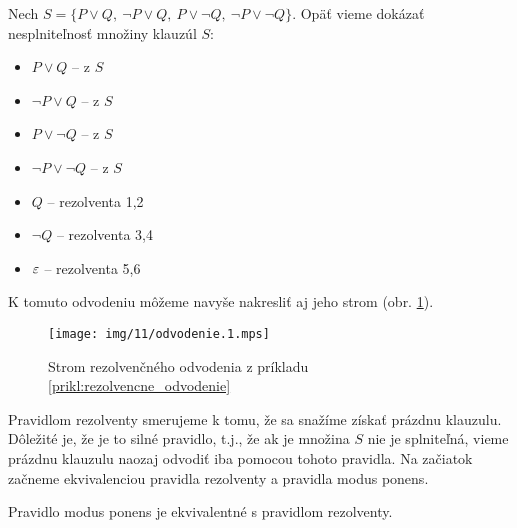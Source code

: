 \begin{priklad}
    \label{prikl:rezolvencne_odvodenie}
    Nech $S=\{P \lor Q,\ \neg P \lor Q,\ 
            P \lor \neg Q,\ \neg P \lor \neg Q\}$.
    Opäť vieme dokázať nesplniteľnosť množiny klauzúl $S$:

    \begin{itemize}
	\item[1:] $P \lor Q$ -- z $S$
	\item[2:] $\neg P \lor Q$ -- z $S$
	\item[3:] $P \lor \neg Q$ -- z $S$
	\item[4:] $\neg P \lor \neg Q$ -- z $S$
	\item[5:] $Q$ -- rezolventa 1,2
	\item[6:] $\neg Q$ -- rezolventa 3,4
        \item[7:] $\varepsilon$ -- rezolventa 5,6
    \end{itemize}

    K tomuto odvodeniu môžeme navyše nakresliť aj jeho strom (obr.
    \ref{fig:strom_odvodenia}).

    \begin{figure}[h]
	\centering\texttt{[image: img/11/odvodenie.1.mps]}
	\caption{Strom rezolvenčného odvodenia z príkladu 
            \ref{prikl:rezolvencne_odvodenie}}
        \label{fig:strom_odvodenia}
    \end{figure}
\end{priklad}

\begin{poznamka}
    Pravidlom rezolventy smerujeme k tomu, že sa snažíme získať
    prázdnu klauzulu. Dôležité je, že je to silné pravidlo,
    t.j., že ak je množina $S$ nie je splniteľná, vieme prázdnu
    klauzulu naozaj odvodiť iba pomocou tohoto pravidla. Na začiatok
    začneme ekvivalenciou pravidla rezolventy a pravidla modus ponens.
\end{poznamka}

\begin{lema}
    Pravidlo modus ponens je ekvivalentné s pravidlom rezolventy.
\end{lema}

